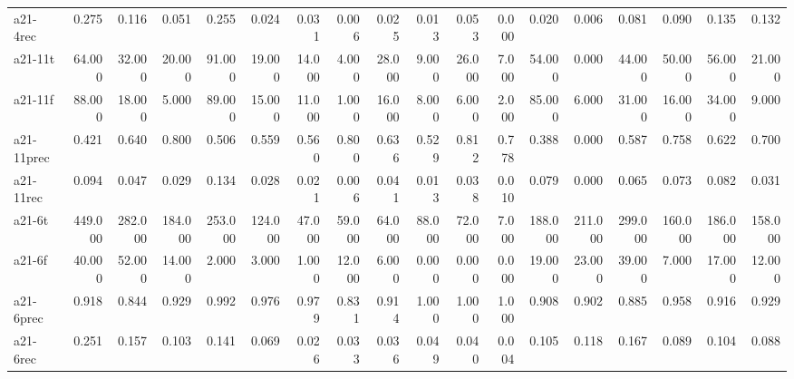 \begin{tabular}{lrrrrrrrrrrrrrrrrr}
a21-4rec   &    0.275 &       0.116 &       0.051 &    0.255 &    0.024 &    0.031 &   0.006 &       0.025 &   0.013 &   0.053 &   0.000 &       0.020 &    0.006 &    0.081 &    0.090 &      0.135 &           0.132 \\
a21-11t    &   64.000 &      32.000 &      20.000 &   91.000 &   19.000 &   14.000 &   4.000 &      28.000 &   9.000 &  26.000 &   7.000 &      54.000 &    0.000 &   44.000 &   50.000 &     56.000 &          21.000 \\
a21-11f    &   88.000 &      18.000 &       5.000 &   89.000 &   15.000 &   11.000 &   1.000 &      16.000 &   8.000 &   6.000 &   2.000 &      85.000 &    6.000 &   31.000 &   16.000 &     34.000 &           9.000 \\
a21-11prec &    0.421 &       0.640 &       0.800 &    0.506 &    0.559 &    0.560 &   0.800 &       0.636 &   0.529 &   0.812 &   0.778 &       0.388 &    0.000 &    0.587 &    0.758 &      0.622 &           0.700 \\
a21-11rec  &    0.094 &       0.047 &       0.029 &    0.134 &    0.028 &    0.021 &   0.006 &       0.041 &   0.013 &   0.038 &   0.010 &       0.079 &    0.000 &    0.065 &    0.073 &      0.082 &           0.031 \\
a21-6t     &  449.000 &     282.000 &     184.000 &  253.000 &  124.000 &   47.000 &  59.000 &      64.000 &  88.000 &  72.000 &   7.000 &     188.000 &  211.000 &  299.000 &  160.000 &    186.000 &         158.000 \\
a21-6f     &   40.000 &      52.000 &      14.000 &    2.000 &    3.000 &    1.000 &  12.000 &       6.000 &   0.000 &   0.000 &   0.000 &      19.000 &   23.000 &   39.000 &    7.000 &     17.000 &          12.000 \\
a21-6prec  &    0.918 &       0.844 &       0.929 &    0.992 &    0.976 &    0.979 &   0.831 &       0.914 &   1.000 &   1.000 &   1.000 &       0.908 &    0.902 &    0.885 &    0.958 &      0.916 &           0.929 \\
a21-6rec   &    0.251 &       0.157 &       0.103 &    0.141 &    0.069 &    0.026 &   0.033 &       0.036 &   0.049 &   0.040 &   0.004 &       0.105 &    0.118 &    0.167 &    0.089 &      0.104 &           0.088 \\
\bottomrule
\end{tabular}

